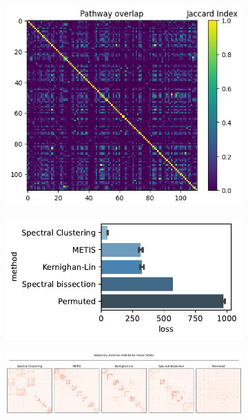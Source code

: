 \begin{figure}[H]
    \begin{subfigure}[t]{0.5\textwidth}
        \caption{}
        \includegraphics[width=\textwidth]{./extended_plots/jaccard_mat_sub.png}        
    \end{subfigure}
    \begin{subfigure}[t]{0.5\textwidth}
        \caption{}
        \includegraphics[width=\textwidth]{./extended_plots/partitioning_losses.pdf}        
    \end{subfigure}
    \begin{subfigure}[t]{1\textwidth}
        \caption{}
        \includegraphics[width=\textwidth]{./extended_plots/adjacency_matrices_ordered_by_cluster_labels.pdf}        

\end{subfigure}
\end{figure}
